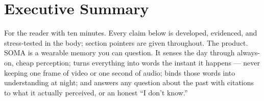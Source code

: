 \chapter*{Executive Summary}\label{executive-summary}

For the reader with ten minutes. Every claim below is developed, evidenced, and stress-tested in the body; section pointers are given throughout. The product. SOMA is a wearable memory you can question. It senses the day through always-on, cheap perception; turns everything into words the instant it happens --- never keeping one frame of video or one second of audio; binds those words into understanding at night; and answers any question about the past with citations to what it actually perceived, or an honest ``I don't know.''

